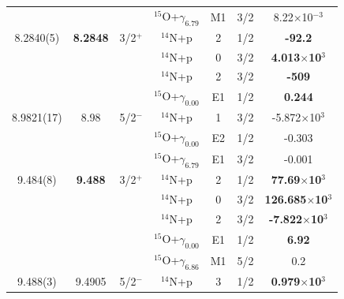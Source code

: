 \begin{table}[]
\begin{center}
\begin{threeparttable}
\begin{tabular}{c  c  c  c  c  c  c}
	&	&	&	$^{15}$O+$\gamma_{6.79}$	&	M1	&	3/2	&	{8.22$\times$10$^{-3}$}\\
8.2840(5)& \textbf{8.2848}&	3/2$^+$	&	$^{14}$N+p	&	2	&	1/2	&	\textbf{-92.2}\\
	&	&	&	$^{14}$N+p	&	0	&	3/2	&	\textbf{4.013$\times$10$^3$}\\
	&	&	&	$^{14}$N+p	&	2	&	3/2	&	\textbf{-509}\\
	&	&	&	$^{15}$O+$\gamma_{0.00}$	&	E1	&	1/2	&	\textbf{0.244}\\
8.9821(17) & {8.98}&	5/2$^-$	&	$^{14}$N+p	&	1	&	3/2	&	{-5.872$\times$10$^3$}\\
	&	&	&	$^{15}$O+$\gamma_{0.00}$	&	E2	&	1/2	&	{-0.303}\\
	&	&	&	$^{15}$O+$\gamma_{6.79}$	&	E1	&	3/2	&	{-0.001}\\
9.484(8) & \textbf{9.488}&	3/2$^+$	&	$^{14}$N+p	&	2	&	1/2	&	\textbf{77.69$\times$10$^3$}	\\
	&	&	&	$^{14}$N+p	&	0	&	3/2	&	\textbf{126.685$\times$10$^3$}	\\
	&	&	&	$^{14}$N+p	&	2	&	3/2	&	\textbf{-7.822$\times$10$^3$}\\
	&	&	&	$^{15}$O+$\gamma_{0.00}$	&	E1	&	1/2	&	\textbf{6.92}\\
	&	&	&	$^{15}$O+$\gamma_{6.86}$	&	M1	&	5/2	&	{0.2}\\
9.488(3) & {9.4905}&	5/2$^-$	&	$^{14}$N+p	&	3	&	1/2	&	\textbf{0.979$\times$10$^3$}\\

\end{tabular}
\end{threeparttable}
\end{center}
\end{table}

